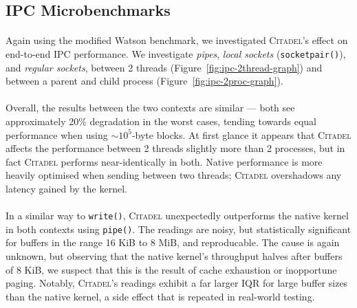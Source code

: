 \subsection{IPC Microbenchmarks}
\label{sec:ipc-microbenchmarks}

\paragraph{} Again using the modified Watson benchmark, we investigated \textsc{Citadel}'s effect on end-to-end IPC performance. We investigate \textit{pipes}, \textit{local sockets} (\texttt{socketpair()}), and \textit{regular sockets}, between 2 threads (Figure~\ref{fig:ipc-2thread-graph}) and between a parent and child process (Figure~\ref{fig:ipc-2proc-graph}).

\paragraph{} Overall, the results between the two contexts are similar --- both see approximately 20\% degradation in the worst cases, tending towards equal performance when using $\sim 10^5$-byte blocks. At first glance it appears that \textsc{Citadel} affects the performance between 2 threads slightly more than 2 processes, but in fact \textsc{Citadel} performs near-identically in both. Native performance is more heavily optimised when sending between two threads; \textsc{Citadel} overshadows any latency gained by the kernel.

\paragraph{} In a similar way to \texttt{write()}, \textsc{Citadel} unexpectedly outperforms the native kernel in both contexts using \texttt{pipe()}. The readings are noisy, but statistically significant for buffers in the range 16 KiB to 8 MiB, and reproducable. The cause is again unknown, but observing that the native kernel's throughput halves after buffers of 8 KiB, we suspect that this is the result of cache exhaustion or inopportune paging. Notably, \textsc{Citadel}'s readings exhibit a far larger IQR for large buffer sizes than the native kernel, a side effect that is repeated in real-world testing.

